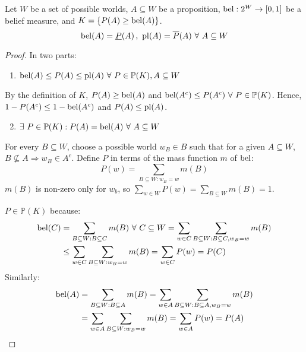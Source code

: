 \begin{thm}
  Let $W$ be a set of possible worlds, $A \subseteq W$ be a proposition,
  $\operatorname*{bel} : 2^W \rightarrow [0, 1]$ be a belief measure, and
  $K = \{ P(A) \geq \operatorname*{bel}(A) \}$.
  \begin{equation}
    \operatorname*{bel}(A) = \underline{P}(A)\,,\
    \operatorname*{pl}(A) = \overline{P}(A)
    \ \forall\ A \subseteq W
  \end{equation}
  \begin{proof}
    In two parts:
    \begin{enumerate}
      \item $\bel(A) \leq P(A) \leq \pl(A) \ \forall\ P \in \mathbb{P}(K), A \subseteq W$
    \end{enumerate}

    By the definition of $K$,
    $P(A) \geq \operatorname*{bel}(A)$ and $\operatorname*{bel}(A^c) \leq P(A^c) \ \forall\ P \in \mathbb{P}(K)$.
    Hence, $1 - P(A^c) \leq 1 - \operatorname*{bel}(A^c)$ and $P(A) \leq \operatorname*{pl}(A)$.

    \begin{enumerate}
      \setcounter{enumi}{1}
      \item $\exists\ P \in \mathbb{P}(K) : P(A) = \operatorname*{bel}(A) \ \forall\ A \subseteq W$
    \end{enumerate}

    For every $B \subseteq W$, choose a possible world $w_B \in B$ such that
    for a given $A \subseteq W$,  $B \not\subseteq A \Rightarrow w_B \in A^c$.
    Define $P$ in terms of the mass function $m$ of $\operatorname*{bel}$:
    \begin{equation*}
      P(w) = \sum_{B \subseteq W : w_B = w} m(B)
    \end{equation*}
    $m(B)$ is non-zero only for $w_b$, so
    $\sum_{w \in W} P(w) = \sum_{B \subseteq W} m(B) = 1$.

    $P \in \mathbb{P}(K)$ because:
    \begin{align*}
      \operatorname*{bel}(C)
       & = \sum_{B \subseteq W : B \subseteq C} m(B) \ \forall\ C \subseteq W
      = \sum_{w \in C} \sum_{B \subseteq W : B \subseteq C, w_B = w} m(B)     \\
       & \leq \sum_{w \in C} \sum_{B \subseteq W : w_B = w} m(B)
      = \sum_{w \in C} P(w)
      = P(C)
    \end{align*}
    Similarly:
    \begin{align*}
      \operatorname*{bel}(A)
       & = \sum_{B \subseteq W : B \subseteq A} m(B)
      = \sum_{w \in A} \sum_{B \subseteq W : B \subseteq A, w_B = w} m(B) \\
       & = \sum_{w \in A} \sum_{B \subseteq W : w_B = w} m(B)
      = \sum_{w \in A} P(w)
      = P(A)
    \end{align*}
  \end{proof}
\end{thm}

